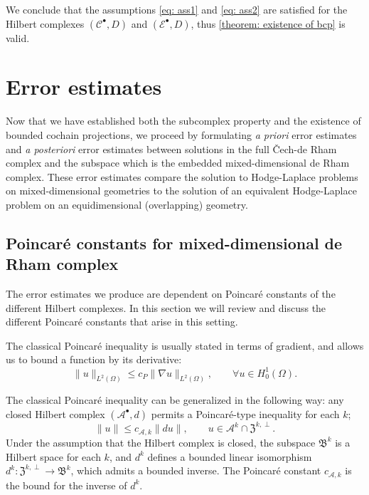 \documentclass[reqno]{amsart}
\numberwithin{equation}{section}
\theoremstyle{definition}
\newcommand{\Ac}{\mathcal{A}}
\newcommand{\Cc}{\mathcal{C}}
\newcommand{\Ec}{\mathcal{E}}
\newcommand{\Bf}{\mathfrak{B}}
\newcommand{\Zf}{\mathfrak{Z}}
\begin{document}
We conclude that the assumptions \cref{eq: ass1} and \cref{eq: ass2} are satisfied for the Hilbert complexes $(\Cc^\bullet, D)$ and $(\Ec^\bullet, D)$, thus \cref{theorem: existence of bcp} is valid.


%
%
%
%
%
%
%
%
%
%
%
%
%
%
%
%
%
%
%
%
%
%
%
%
%
%
%
\section{Error estimates}\label{section: error estimates}
Now that we have established both the subcomplex property and the existence of bounded cochain projections, we proceed by formulating \emph{a priori} error estimates and \emph{a posteriori} error estimates between solutions in the full \v{C}ech-de Rham complex and the subspace which is the embedded mixed-dimensional de Rham complex. These error estimates compare the solution to Hodge-Laplace problems on mixed-dimensional geometries to the solution of an equivalent Hodge-Laplace problem on an equidimensional (overlapping) geometry. 

\subsection{Poincaré constants for mixed-dimensional de Rham complex}
The error estimates we produce are dependent on Poincaré constants of the different Hilbert complexes. In this section we will review and discuss the different Poincaré constants that arise in this setting.

The classical Poincaré inequality is usually stated in terms of gradient, and allows us to bound a function by its derivative:
\begin{equation} \label{eq: classical PC ineq}
\|u\|_{L^2(\Omega)} \leq c_P \|\nabla u\|_{L^2(\Omega)}, \qquad \forall u \in H_0^1(\Omega).
\end{equation}

The classical Poincaré inequality can be generalized in the following way: any closed Hilbert complex $(\Ac^\bullet, d)$ permits a Poincaré-type inequality for each $k$;
\begin{equation}\label{eq: poincare ineq HC}
\|u\| \leq c_{\Ac,k} \|du\|, \qquad u \in \Ac^k \cap \Zf^{k,\perp}.
\end{equation}
Under the assumption that the Hilbert complex is closed, the subspace $\Bf^k$ is a Hilbert space for each $k$, and $d^k$ defines a bounded linear isomorphism $d^k: \Zf^{k,\perp} \to \Bf^k$, which admits a bounded inverse. The Poincaré constant $c_{\Ac,k}$ is the bound for the inverse of $d^k$.
\end{document}
